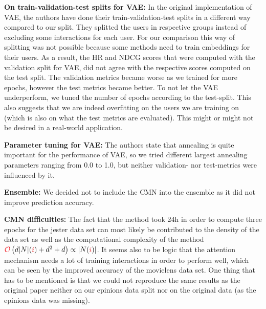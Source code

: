 \textbf{On train-validation-test splits for VAE:} 
In the original implementation of VAE, the authors have done their train-validation-test splits in a different way compared to our split.
They splitted the users in respective groups instead of excluding some interactions for each user. 
For our comparison this way of splitting was not possible because some methods need to train embeddings for their users. 
As a result, the HR and NDCG scores that were computed with the validation split for VAE, did not agree with the respective scores computed on the test split. 
The validation metrics became worse as we trained for more epochs, however the test metrics became better. 
To not let the VAE underperform, we tuned the number of epochs according to the test-split. 
This also suggests that we are indeed overfitting on the users we are training on (which is also on what the test metrics are evaluated). 
This might or might not be desired in a real-world application.

\textbf{Parameter tuning for VAE:} 
The authors state that annealing is quite important for the performance of VAE, so we tried different largest annealing parameters ranging from 0.0 to 1.0, but neither validation- nor test-metrics were influenced by it.

\textbf{Ensemble:} 
We decided not to include the CMN into the ensemble as it did not improve prediction accuracy.

\textbf{CMN difficulties:}
The fact that the method took 24h in order to compute three epochs for the jester data set can most likely be contributed to the density of the data set as well as the computational complexity of the method $\bigO\left(d\abs{N}(\idxi)+d^2+d\right)\propto\abs{N(\idxi)}$.
It seems also to be logic that the attention mechanism needs a lot of training interactions in order to perform well, which can be seen by the improved accuracy of the movielens data set.
One thing that has to be mentioned is that we could not reproduce the same results as the original paper neither on our epinions data split nor on the original data (as the epinions data was missing).
